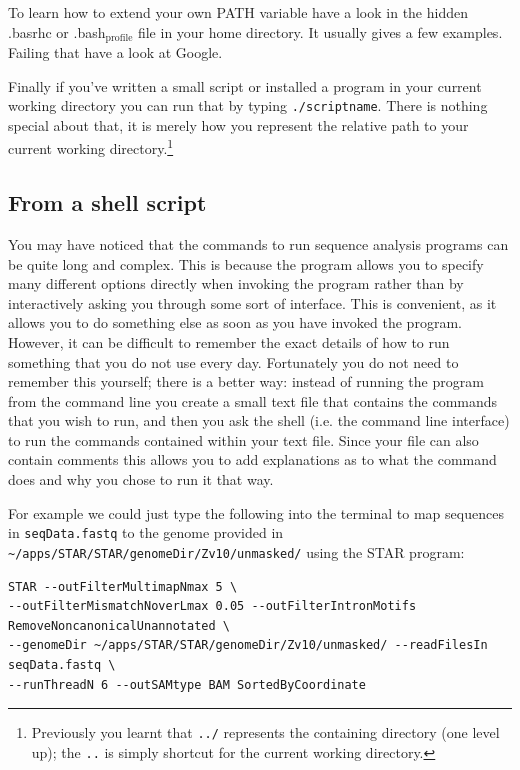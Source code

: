 \documentclass[11pt]{article}
\begin{document}
To learn how to extend your own PATH variable have a look in the hidden
.basrhc or .bash$_{\mathrm{profile}}$ file in your home directory. It usually gives a
few examples. Failing that have a look at Google.

Finally if you've written a small script or installed a program in your
current working directory you can run that by typing \texttt{./scriptname}. There
is nothing special about that, it is merely how you represent the
relative path to your current working directory.\footnote{Previously you learnt that \texttt{../} represents the containing directory
(one level up); the \texttt{..} is simply shortcut for the current working directory.
 }
\subsection{From a shell script}
\label{sec-3-2}

You may have noticed that the commands to run sequence analysis programs can
be quite long and complex. This is because the program allows you to specify
many different options directly when invoking the program rather than by
interactively asking you through some sort of interface. This is convenient,
as it allows you to do something else as soon as you have invoked the
program. However, it can be difficult to remember the exact details of how to
run something that you do not use every day. Fortunately you do not need to
remember this yourself; there is a better way: instead of running the program
from the command line you create a small text file that contains the commands
that you wish to run, and then you ask the shell (i.e. the command line
interface) to run the commands contained within your text file. Since your
file can also contain comments this allows you to add explanations as to what
the command does and why you chose to run it that way.

For example we could just type the following into the terminal to map
sequences in \texttt{seqData.fastq} to the genome provided in
\texttt{\textasciitilde{}/apps/STAR/STAR/genomeDir/Zv10/unmasked/}
using the STAR program:


\begin{verbatim}
STAR --outFilterMultimapNmax 5 \
--outFilterMismatchNoverLmax 0.05 --outFilterIntronMotifs RemoveNoncanonicalUnannotated \
--genomeDir ~/apps/STAR/STAR/genomeDir/Zv10/unmasked/ --readFilesIn seqData.fastq \
--runThreadN 6 --outSAMtype BAM SortedByCoordinate
\end{verbatim}
\end{document}
